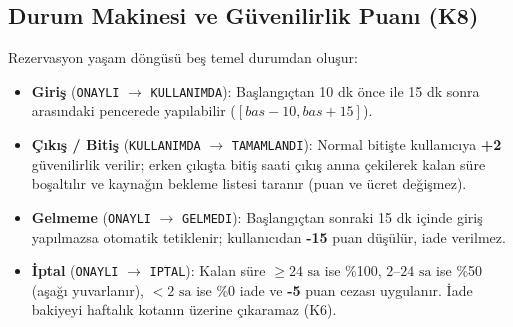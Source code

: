 \documentclass[conference]{IEEEtran}
\begin{document}
\subsection{Durum Makinesi ve Güvenilirlik Puanı (K8)}
Rezervasyon yaşam döngüsü beş temel durumdan oluşur:
\begin{itemize}\setlength{\itemsep}{1pt}\setlength{\parskip}{0pt}
    \item \textbf{Giriş} (\texttt{ONAYLI} $\rightarrow$ \texttt{KULLANIMDA}): Başlangıçtan 10 dk önce ile 15 dk sonra arasındaki pencerede yapılabilir ($[bas-10, bas+15]$).
    \item \textbf{Çıkış / Bitiş} (\texttt{KULLANIMDA} $\rightarrow$ \texttt{TAMAMLANDI}): Normal bitişte kullanıcıya \textbf{+2} güvenilirlik verilir; erken çıkışta bitiş saati çıkış anına çekilerek kalan süre boşaltılır ve kaynağın bekleme listesi taranır (puan ve ücret değişmez).
    \item \textbf{Gelmeme} (\texttt{ONAYLI} $\rightarrow$ \texttt{GELMEDI}): Başlangıçtan sonraki 15 dk içinde giriş yapılmazsa otomatik tetiklenir; kullanıcıdan \textbf{-15} puan düşülür, iade verilmez.
    \item \textbf{İptal} (\texttt{ONAYLI} $\rightarrow$ \texttt{IPTAL}): Kalan süre $\ge 24\text{ sa}$ ise \%100, $2$--$24\text{ sa}$ ise \%50 (aşağı yuvarlanır), $<2\text{ sa}$ ise \%0 iade ve \textbf{-5} puan cezası uygulanır. İade bakiyeyi haftalık kotanın üzerine çıkaramaz (K6).
\end{itemize}
\end{document}
